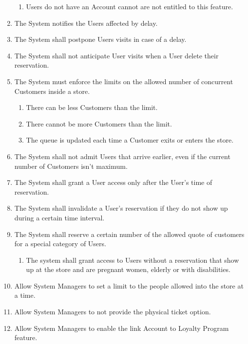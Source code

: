 \begin{enumerate}
\begin{enumerate}
            \item Users do not have an Account cannot are not entitled to this feature.
        \end{enumerate}
    \item The System notifies the Users affected by delay.
    \item The System shall postpone Users visits in case of a delay.
    \item The System shall not anticipate User visits when a User delete their reservation.
    \item The System must enforce the limits on the allowed number of concurrent Customers inside a store.
        \begin{enumerate}
            \item There can be less Customers than the limit.
            \item There cannot be more Customers than the limit.
            \item The queue is updated each time a Customer exits or enters the store.
        \end{enumerate}
    \item The System shall not admit Users that arrive earlier, even if the current number of Customers isn't maximum.
    \item The System shall grant a User access only after the User's time of reservation.
    \item The System shall invalidate a User's reservation if they do not show up during a certain time interval.
    \item The System shall reserve a certain number of the allowed quote of customers for a special category of Users.
        \begin{enumerate}
            \item The system shall grant access to Users without a reservation that show up at the store and are pregnant women, elderly or with disabilities.
        \end{enumerate}
    \item Allow System Managers to set a limit to the people allowed into the store at a time.
    \item Allow System Managers to not provide the physical ticket option.
    \item Allow System Managers to enable the link Account to Loyalty Program feature.
\end{enumerate}

